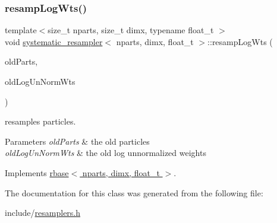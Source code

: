\subsubsection{\texorpdfstring{resamp\+Log\+Wts()}{resampLogWts()}}
{\footnotesize\ttfamily template$<$size\+\_\+t nparts, size\+\_\+t dimx, typename float\+\_\+t $>$ \\
void \hyperlink{classsystematic__resampler}{systematic\+\_\+resampler}$<$ nparts, dimx, float\+\_\+t $>$\+::resamp\+Log\+Wts (\begin{DoxyParamCaption}\item[{\hyperlink{classrbase_aa12fc826befa6ba0647b5f59ebc396ee}{array\+Vec} \&}]{old\+Parts,  }\item[{\hyperlink{classrbase_a6f76bef853e508cb5b6f546d231b06f5}{array\+Float} \&}]{old\+Log\+Un\+Norm\+Wts }\end{DoxyParamCaption})\hspace{0.3cm}{\ttfamily [virtual]}}



resamples particles. 


\begin{DoxyParams}{Parameters}
{\em old\+Parts} & the old particles \\
\hline
{\em old\+Log\+Un\+Norm\+Wts} & the old log unnormalized weights \\
\hline
\end{DoxyParams}


Implements \hyperlink{classrbase_aff0f6f88fd4656e67f5ebc870f10dd44}{rbase$<$ nparts, dimx, float\+\_\+t $>$}.



The documentation for this class was generated from the following file\+:\begin{DoxyCompactItemize}
\item 
include/\hyperlink{resamplers_8h}{resamplers.\+h}\end{DoxyCompactItemize}
